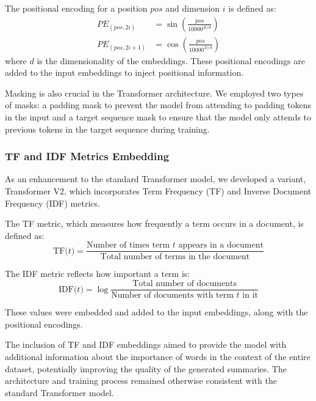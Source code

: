 \documentclass[a4paper, 11pt]{article}
\begin{document}
The positional encoding for a position \(pos\) and dimension \(i\) is defined as:
\begin{equation}
	\begin{aligned}
		PE_{(pos, 2i)} &= \sin\left(\frac{pos}{10000^{2i/d}}\right) \\
		PE_{(pos, 2i+1)} &= \cos\left(\frac{pos}{10000^{2i/d}}\right)
	\end{aligned}
\end{equation}
where \(d\) is the dimensionality of the embeddings. These positional encodings are added to the input embeddings to inject positional information.

Masking is also crucial in the Transformer architecture. We employed two types of masks: a padding mask to prevent the model from attending to padding tokens in the input and a target sequence mask to ensure that the model only attends to previous tokens in the target sequence during training.

\subsubsection{TF and IDF Metrics Embedding}

As an enhancement to the standard Transformer model, we developed a variant, Transformer V2, which incorporates Term Frequency (TF) and Inverse Document Frequency (IDF) metrics.

The TF metric, which measures how frequently a term occurs in a document, is defined as:
\begin{equation}
    \text{TF($t$)} = \frac{\text{Number of times term $t$ appears in a document}}{\text{Total number of terms in the document}}
\end{equation}

The IDF metric reflects how important a term is:
\begin{equation}
    \text{IDF($t$)} = \log \frac{\text{Total number of documents}}{\text{Number of documents with term $t$ in it}}
\end{equation}

These values were embedded and added to the input embeddings, along with the positional encodings.

The inclusion of TF and IDF embeddings aimed to provide the model with additional information about the importance of words in the context of the entire dataset, potentially improving the quality of the generated summaries. The architecture and training process remained otherwise consistent with the standard Transformer model.
\end{document}
